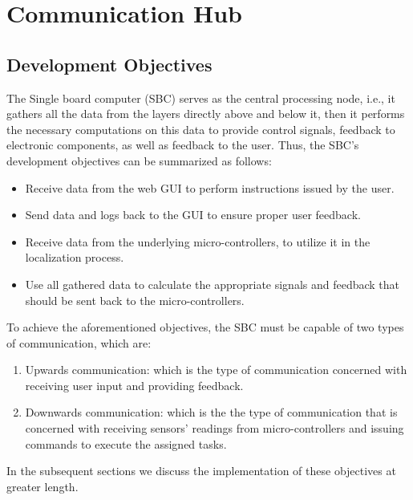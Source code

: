 \chapter{Communication Hub}
\label{ch:CPN-comm}

\section{Development Objectives}
The Single board computer (SBC) serves as the central processing node, i.e., it gathers all the data from the layers directly above and below it, then it performs the necessary computations on this data to provide control signals, feedback to electronic components, as well as feedback to the user. Thus, the SBC's development objectives can be summarized as follows:

\begin{itemize}
	\item Receive data from the web GUI to perform instructions issued by the user.
	\item Send data and logs back to the GUI to ensure proper user feedback.
	\item Receive data from the underlying micro-controllers, to utilize it in the localization process.
	\item Use all gathered data to calculate the appropriate signals and feedback that should be sent back to the micro-controllers.
\end{itemize}

To achieve the aforementioned objectives, the SBC must be capable of two types of communication, which are:
\begin{enumerate}
	\item Upwards communication: which is the type of communication concerned with receiving user input and providing feedback.
	\item Downwards communication: which is the the type of communication that is concerned with receiving sensors' readings from micro-controllers and issuing commands to execute the assigned tasks.
\end{enumerate}

In the subsequent sections we discuss the implementation of these objectives at greater length.

